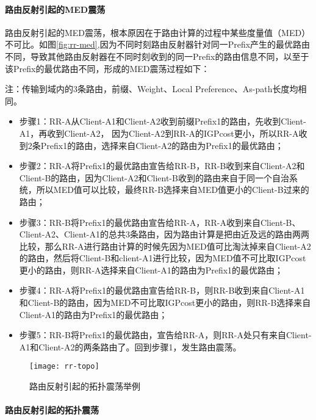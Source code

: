 \paragraph{路由反射引起的MED震荡}

路由反射引起的MED震荡，根本原因在于路由计算的过程中某些度量值（MED）不可比。如图\ref{fig:rr-med},因为不同时刻路由反射器针对同一Prefix产生的最优路由不同，导致其他路由反射器在不同时刻收到的同一Prefix的路由信息不同，以至于该Prefix的最优路由不同，形成的MED震荡过程如下：

注：传输到域内的3条路由，前缀、Weight、Local Preference、As-path长度均相同。

\begin{itemize}
\item 步骤1：RR-A从Client-A1和Client-A2收到前缀Prefix1的路由，先收到Client-A1，再收到Client-A2， 因为Client-A2到RR-A的IGPcost更小，所以RR-A收到2条Prefix1的路由，选择来自Client-A2的路由为Prefix1的最优路由；
\item 步骤2：RR-A将Prefix1的最优路由宣告给RR-B，RR-B收到来自Client-A2和Client-B的路由，因为Client-A2和Client-B收到的路由来自于同一个自治系统，所以MED值可以比较，最终RR-B选择来自MED值更小的Client-B过来的路由；
\item 步骤3：RR-B将Prefix1的最优路由宣告给RR-A，RR-A收到来自Client-B、Client-A2、Client-A1的总共3条路由，因为路由计算是把由近及远的路由两两比较，那么RR-A进行路由计算的时候先因为MED值可比淘汰掉来自Client-A2的路由，然后将Client-B和client-A1进行比较，因为MED值不可比取IGPcost更小的路由，则RR-A选择来自Client-A1的路由为Prefix1的最优路由；
\item 步骤4：RR-A将Prefix1的最优路由宣告给RR-B，则RR-B收到来自Client-A1和Client-B的路由，因为MED不可比取IGPcost更小的路由，则RR-B选择来自Client-A1的路由为Prefix1的最优路由；
\item 步骤5：RR-B将Prefix1的最优路由，宣告给RR-A，则RR-A处只有来自Client-A1和Client-A2的两条路由了。回到步骤1，发生路由震荡。
\end{itemize}


\begin{figure}
  \centering
  \texttt{[image: rr-topo]}
  \caption{路由反射引起的拓扑震荡举例\cite{ibgp2016infocom}}
  \label{fig:rr-topo}
\end{figure}

\paragraph{路由反射引起的拓扑震荡}

